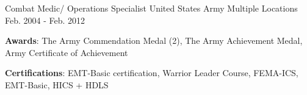 

\begin{cventries}

  \cventry
    {Combat Medic/ Operations Specialist} %
    {United States Army} %
    {Multiple Locations} %
    {Feb. 2004 - Feb. 2012} %
    {
      \begin{cvitems} %
        \item {\textbf{Awards}: The Army Commendation Medal (2), The Army Achievement Medal, Army Certificate of Achievement}
        \item {\textbf{Certifications}: EMT-Basic certification, Warrior Leader Course, FEMA-ICS, EMT-Basic, HICS + HDLS}
      \end{cvitems}
    }


\end{cventries}
